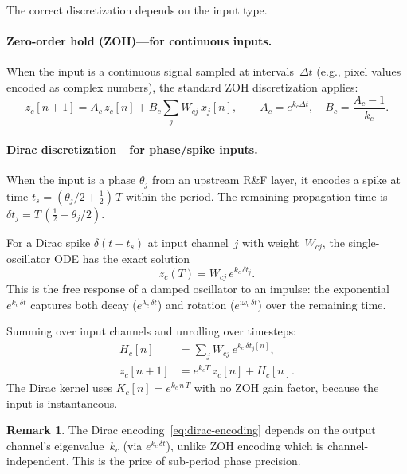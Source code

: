 \documentclass[11pt]{article}
\newcommand{\im}{\mathrm{i}}
\newcommand{\dt}{\Delta t}
\newcommand{\eg}{e.g.}
\theoremstyle{definition}
\newtheorem{remark}{Remark}
\begin{document}
The correct discretization depends on the input type.

\paragraph{Zero-order hold (ZOH)---for continuous inputs.}
When the input is a continuous signal sampled at intervals~$\dt$
(\eg, pixel values encoded as complex numbers), the standard ZOH
discretization applies:
\begin{equation}\label{eq:zoh}
  z_c[n+1] = A_c\,z_c[n] + B_c\sum_j W_{cj}\,x_j[n],
  \qquad A_c = e^{k_c\dt},\quad B_c = \frac{A_c - 1}{k_c}.
\end{equation}

\paragraph{Dirac discretization---for phase/spike inputs.}
When the input is a phase $\theta_j$ from an upstream R\&F layer, it
encodes a spike at time $t_s = (\theta_j/2 + \tfrac12)\,T$ within the
period. The remaining propagation time is
$\delta t_j = T\,(\tfrac12 - \theta_j/2)$.

For a Dirac spike $\delta(t-t_s)$ at input channel~$j$ with
weight~$W_{cj}$, the single-oscillator ODE has the exact solution
\begin{equation}\label{eq:dirac-response}
  z_c(T) = W_{cj}\,e^{k_c\,\delta t_j}.
\end{equation}
This is the free response of a damped oscillator to an impulse: the
exponential $e^{k_c\,\delta t}$ captures both decay
($e^{\lambda_c\,\delta t}$) and rotation ($e^{\im\omega_c\,\delta t}$)
over the remaining time.

Summing over input channels and unrolling over timesteps:
\begin{align}
  H_c[n] &= \sum_j W_{cj}\,e^{k_c\,\delta t_{j}[n]},
    \label{eq:dirac-encoding}\\
  z_c[n+1] &= e^{k_c T}\,z_c[n] + H_c[n].
    \label{eq:dirac-recurrence}
\end{align}
The Dirac kernel uses $K_c[n] = e^{k_c\,n\,T}$ with no ZOH gain factor,
because the input is instantaneous.

\begin{remark}
The Dirac encoding~\eqref{eq:dirac-encoding} depends on the output
channel's eigenvalue~$k_c$ (via $e^{k_c\,\delta t}$), unlike ZOH
encoding which is channel-independent. This is the price of sub-period
phase precision.
\end{remark}
\end{document}

